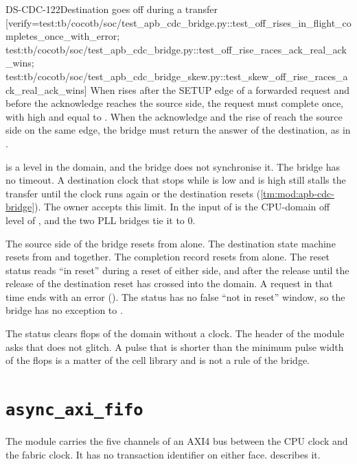 \begin{requirement}{DS-CDC-122}{Destination goes off during a transfer}
[verify={test:tb/cocotb/soc/test_apb_cdc_bridge.py::test_off_rises_in_flight_completes_once_with_error; test:tb/cocotb/soc/test_apb_cdc_bridge.py::test_off_rise_races_ack_real_ack_wins; test:tb/cocotb/soc/test_apb_cdc_bridge_skew.py::test_skew_off_rise_races_ack_real_ack_wins}]
When  rises after the SETUP edge of a forwarded request and before the acknowledge reaches the source side, the request must complete once, with  high and  equal to . When the acknowledge and the rise of  reach the source side on the same edge, the bridge must return the answer of the destination, as in .
\end{requirement}
\begin{information}
 is a level in the  domain, and the bridge does not synchronise it. The bridge has no timeout. A destination clock that stops while  is low and  is high still stalls the transfer until the clock runs again or the destination resets (\cref{tm:mod:apb-cdc-bridge}). The owner accepts this limit. In  the input of  is the CPU-domain off level of , and the two PLL bridges tie it to 0.
\end{information}

\begin{information}
The source side of the bridge resets from  alone. The destination state machine resets from  and  together. The completion record resets from  alone. The reset status  reads ``in reset'' during a reset of either side, and after the release until the release of the destination reset has crossed into the  domain. A request in that time ends with an error (). The status has no false ``not in reset'' window, so the bridge has no exception to .

The status clears flops of the  domain without a clock. The header of the module asks that  does not glitch. A pulse that is shorter than the minimum pulse width of the flops is a matter of the cell library and is not a rule of the bridge.
\end{information}

\section{\texttt{async\_axi\_fifo}}\label{ds:mod:async-axi-fifo}
The module  carries the five channels of an AXI4 bus between the CPU clock and the fabric clock. It has no transaction identifier on either face.  describes it.

